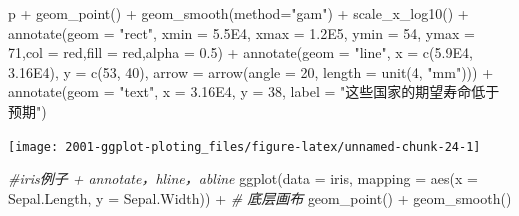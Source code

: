 \documentclass[
]{book}
\newenvironment{Shaded}{\begin{snugshade}}{\end{snugshade}}
\newcommand{\AttributeTok}[1]{\textcolor[rgb]{0.77,0.63,0.00}{#1}}
\newcommand{\CommentTok}[1]{\textcolor[rgb]{0.56,0.35,0.01}{\textit{#1}}}
\newcommand{\DecValTok}[1]{\textcolor[rgb]{0.00,0.00,0.81}{#1}}
\newcommand{\FloatTok}[1]{\textcolor[rgb]{0.00,0.00,0.81}{#1}}
\newcommand{\FunctionTok}[1]{\textcolor[rgb]{0.00,0.00,0.00}{#1}}
\newcommand{\NormalTok}[1]{#1}
\newcommand{\SpecialCharTok}[1]{\textcolor[rgb]{0.00,0.00,0.00}{#1}}
\newcommand{\StringTok}[1]{\textcolor[rgb]{0.31,0.60,0.02}{#1}}
\begin{document}
\begin{Shaded}
\begin{Highlighting}[]
\NormalTok{p }\SpecialCharTok{+} \FunctionTok{geom\_point}\NormalTok{() }\SpecialCharTok{+}
  \FunctionTok{geom\_smooth}\NormalTok{(}\AttributeTok{method=}\StringTok{"gam"}\NormalTok{) }\SpecialCharTok{+}
  \FunctionTok{scale\_x\_log10}\NormalTok{() }\SpecialCharTok{+}
  \FunctionTok{annotate}\NormalTok{(}\AttributeTok{geom =} \StringTok{"rect"}\NormalTok{, }
           \AttributeTok{xmin =} \FloatTok{5.5E4}\NormalTok{, }\AttributeTok{xmax =} \FloatTok{1.2E5}\NormalTok{,}
           \AttributeTok{ymin =} \DecValTok{54}\NormalTok{, }\AttributeTok{ymax =} \DecValTok{71}\NormalTok{,}\AttributeTok{col =} \StringTok{\textquotesingle{}red\textquotesingle{}}\NormalTok{,}\AttributeTok{fill =} \StringTok{\textquotesingle{}red\textquotesingle{}}\NormalTok{,}\AttributeTok{alpha =} \FloatTok{0.5}\NormalTok{) }\SpecialCharTok{+} 
  \FunctionTok{annotate}\NormalTok{(}\AttributeTok{geom =} \StringTok{"line"}\NormalTok{,}
           \AttributeTok{x =} \FunctionTok{c}\NormalTok{(}\FloatTok{5.9E4}\NormalTok{, }\FloatTok{3.16E4}\NormalTok{),}
           \AttributeTok{y =} \FunctionTok{c}\NormalTok{(}\DecValTok{53}\NormalTok{,  }\DecValTok{40}\NormalTok{),}
           \AttributeTok{arrow =} \FunctionTok{arrow}\NormalTok{(}\AttributeTok{angle =} \DecValTok{20}\NormalTok{, }\AttributeTok{length =} \FunctionTok{unit}\NormalTok{(}\DecValTok{4}\NormalTok{, }\StringTok{"mm"}\NormalTok{))) }\SpecialCharTok{+}
  \FunctionTok{annotate}\NormalTok{(}\AttributeTok{geom =} \StringTok{"text"}\NormalTok{,}
           \AttributeTok{x =} \FloatTok{3.16E4}\NormalTok{, }\AttributeTok{y =} \DecValTok{38}\NormalTok{,}
           \AttributeTok{label =} \StringTok{"这些国家的期望寿命低于预期"}\NormalTok{)}
\end{Highlighting}
\end{Shaded}

\begin{center}\texttt{[image: 2001-ggplot-ploting\_files/figure-latex/unnamed-chunk-24-1]} \end{center}

\begin{Shaded}
\begin{Highlighting}[]
\CommentTok{\#iris例子 + annotate，hline，abline}
\FunctionTok{ggplot}\NormalTok{(}\AttributeTok{data =}\NormalTok{ iris, }\AttributeTok{mapping =} \FunctionTok{aes}\NormalTok{(}\AttributeTok{x =}\NormalTok{ Sepal.Length, }\AttributeTok{y =}\NormalTok{ Sepal.Width)) }\SpecialCharTok{+}  \CommentTok{\# 底层画布}
  \FunctionTok{geom\_point}\NormalTok{() }\SpecialCharTok{+}
  \FunctionTok{geom\_smooth}\NormalTok{() }
\end{Highlighting}
\end{Shaded}
\end{document}
